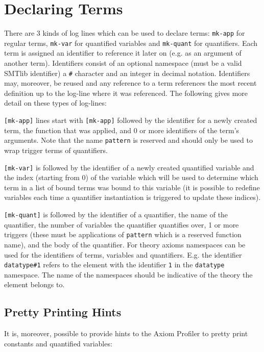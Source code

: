 \documentclass[orivec]{llncs}
\def\noskip{\vspace{-12pt}}
\begin{document}
\section{Declaring Terms}
\noskip
There are 3 kinds of log lines which can be used to declare terms: \texttt{mk-app} for regular terms, \texttt{mk-var} for quantified variables and \texttt{mk-quant} for quantifiers. Each term is assigned an identifier to reference it later on (e.g. as an argument of another term). Identifiers consist of an optional namespace (must be a valid SMTlib identifier) a \texttt{\#} character and an integer in decimal notation. Identifiers may, moreover, be reused and any reference to a term references the most recent definition up to the log-line where it was referenced. The following gives more detail on these types of log-lines:

\texttt{[mk-app]} lines start with \texttt{[mk-app]} followed by the identifier for a newly created term, the function that was applied, and 0 or more identifiers of the term's arguments. Note that the name \texttt{pattern} is reserved and should only be used to wrap trigger terms of quantifiers.

\texttt{[mk-var]} is followed by the identifier of a newly created quantified variable and the index (starting from 0) of the variable which will be used to determine which term in a list of bound terms was bound to this variable (it is possible to redefine variables each time a quantifier instantiation is triggered to update these indices).

\texttt{[mk-quant]} is followed by the identifier of a quantifier, the name of the quantifier, the number of variables the quantifier quantifies over, 1 or more triggers (these must be applications of \texttt{pattern} which is a reserved function name), and the body of the quantifier. For theory axioms namespaces can be used for the identifiers of terms, variables and quantifiers. E.g. the identifier \texttt{datatype\#1} refers to the element with the identifier \texttt{1} in the \texttt{datatype} namespace. The name of the namespaces should be indicative of the theory the element belongs to.

\subsection{Pretty Printing Hints}
\noskip
It is, moreover, possible to provide hints to the Axiom Profiler to pretty print constants and quantified variables:
\end{document}
